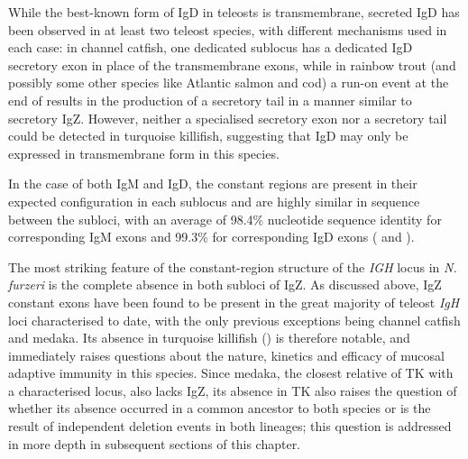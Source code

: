 	While the best-known form of IgD in teleosts is transmembrane, secreted IgD has been observed in at least two teleost species, with different mechanisms used in each case: in channel catfish, one dedicated sublocus has a dedicated IgD secretory exon in place of the transmembrane exons, while in rainbow trout (and possibly some other species like Atlantic salmon and cod) a run-on event at the end of  results in the production of a secretory tail in a manner similar to secretory IgZ. However, neither a specialised secretory exon nor a  secretory tail could be detected in turquoise killifish, suggesting that IgD may only be expressed in transmembrane form in this species. %
	
	In the case of both IgM and IgD, the constant regions are present in their expected configuration in each sublocus and are highly similar in sequence between the subloci, with an average of 98.4\% nucleotide sequence identity for corresponding IgM exons and 99.3\% for corresponding IgD exons ( and ).

	The most striking feature of the constant-region structure of the \textit{IGH} locus in \textit{N. furzeri} is the complete absence in both subloci of IgZ. As discussed above, IgZ constant exons have been found to be present in the great majority of teleost \textit{IgH} loci characterised to date, with the only previous exceptions being channel catfish and medaka. Its absence in turquoise killifish () is therefore notable, and immediately raises questions about the nature, kinetics and efficacy of mucosal adaptive immunity in this species. Since medaka, the closest relative of TK with a characterised locus, also lacks IgZ, its absence in TK also raises the question of whether its absence occurred in a common ancestor to both species or is the result of independent deletion events in both lineages; this question is addressed in more depth in subsequent sections of this chapter. %
	
	

	
